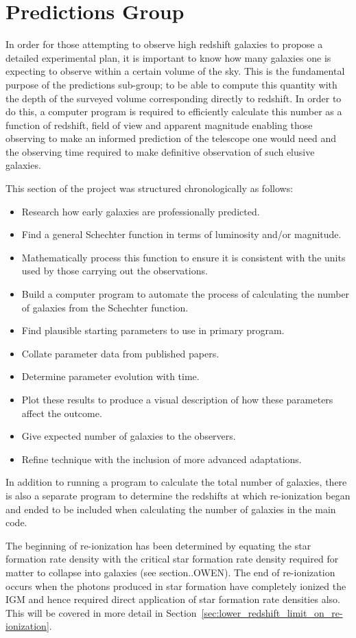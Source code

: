 
\section{Predictions Group} %
\label{sec:predictions_group}
	In order for those attempting to observe high redshift galaxies to propose a detailed experimental plan, it is important to know how many galaxies one is expecting to observe within a certain volume of the sky. This is the fundamental purpose of the predictions sub-group; to be able to compute this quantity with the depth of the surveyed volume corresponding directly to redshift. In order to do this, a computer program is required to efficiently calculate this number as a function of redshift, field of view and apparent magnitude enabling those observing to make an informed prediction of the telescope one would need and the observing time required to make definitive observation of such elusive galaxies.

	This section of the project was structured chronologically as follows:
	\begin{itemize}
		\item Research how early galaxies are professionally predicted.
		\item Find a general Schechter function in terms of luminosity and/or magnitude.
		\item Mathematically process this function to ensure it is consistent with the units used by those carrying out the observations.
		\item Build a computer program to automate the process of calculating the number of galaxies from the Schechter function.
		\item Find plausible starting parameters to use in primary program.
		\item Collate parameter data from published papers.
		\item Determine parameter evolution with time.
		\item Plot these results to produce a visual description of how these parameters affect the outcome.
		\item Give expected number of galaxies to the observers.
		\item Refine technique with the inclusion of more advanced adaptations.
	\end{itemize}

	In addition to running a program to calculate the total number of galaxies, there is also a separate program to determine the redshifts at which re-ionization began and ended to be included when calculating the number of galaxies in the main code.

	The beginning of re-ionization has been determined by equating the star formation rate density with the critical star formation rate density required for matter to collapse into galaxies (see section..OWEN). The end of re-ionization occurs when the photons produced in star formation have completely ionized the IGM and hence required direct application of star formation rate densities also. This will be covered in more detail in Section~\ref{sec:lower_redshift_limit_on_re-ionization}.

